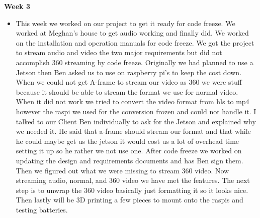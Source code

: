 \documentclass[onecolumn, draftclsnofoot,10pt, compsoc]{IEEEtran}
\begin{document}
            \textbf{Week 3}
            \begin{itemize}
                \item This week we worked on our project to get it ready for code freeze. We worked at Meghan’s house to get audio working and finally did. We worked on the installation and operation manuals for code freeze. We got the project to stream audio and video the two major requirements but did not accomplish 360 streaming by code freeze. Originally we had planned to use a Jetson then Ben asked us to  use on raspberry pi’s to keep the cost down. When we could not get A-frame to stream our video as 360 we were stuff because it should be able to stream the format we use for normal video. When it did not work we tried to convert the video format from hls to mp4 however the raspi we used for the conversion frozen and could not handle it. I talked to our Client Ben individually to ask for the Jetson and explained why we needed it. He said that a-frame should stream our format and that while he could maybe get us the jetson it would cost us a lot of overhead time setting it up so he rather we not use one. After code freeze we worked on updating the design and requirements documents and has Ben sign them. Then we figured out what we were missing to stream 360 video. Now streaming audio, normal, and 360 video we have met the features. The next step is to unwrap the 360 video basically just formatting it so it looks nice. Then lastly will be 3D printing a few pieces to mount onto the raspis and testing batteries.
            \end{itemize}
            
\end{document}
